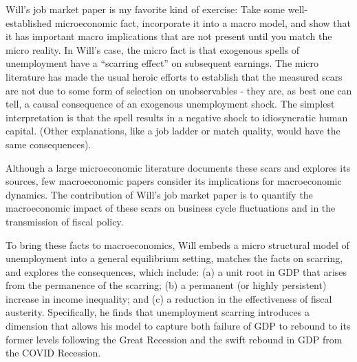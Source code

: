 \documentclass[\econtexRoot/Letter]{subfiles}
\begin{document}
\notinsubfile{\renewcommand{\econtexRoot}{.}}

\hypertarget{job-market-paper}{}
\notinsubfile{\label{sec:job-market-paper}}


Will's job market paper is my favorite kind of exercise: Take some well-established microeconomic fact, incorporate it into a macro model, and show that it has important macro implications that are not present until you match the micro reality. In Will's case, the micro fact is that exogenous spells of unemployment have a ``scarring effect'' on subsequent earnings. The micro literature has made the usual heroic efforts to establish that the measured scars are not due to some form of selection on unobservables - they are, as best one can tell, a causal consequence of an exogenous unemployment shock.  The simplest interpretation is that the spell results in a negative shock to idiosyncratic human capital.  (Other explanations, like a job ladder or match quality, would have the same consequences).

Although a large microeconomic literature documents these scars and explores its sources, few macroeconomic papers consider its implications for macroeconomic dynamics. The contribution of Will's job market paper is to quantify the macroeconomic impact of these scars on business cycle fluctuations and in the transmission of fiscal policy. %

To bring these facts to macroeconomics, Will embeds a micro structural model of unemployment into a general equilibrium setting, matches the facts on scarring, and explores the consequences, which include: (a) a unit root in GDP that arises from the permanence of the scarring; (b) a permanent (or highly persistent) increase in income inequality; and (c) a reduction in the effectiveness of fiscal austerity.
Specifically, he finds that unemployment scarring introduces a dimension that allows his model to capture both failure of GDP to rebound to its former levels following the Great Recession and the swift rebound in GDP from the COVID Recession. %
\end{document}
